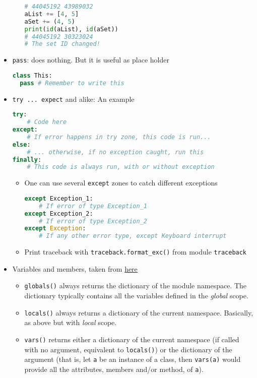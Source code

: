 \documentclass[a4paper,12pt,%
              final%
              ]{article}
\begin{document}
\begin{itemize}
\begin{itemize}
\begin{lstlisting}[language=python]
# 44045192 43989032
aList += [4, 5]
aSet += (4, 5)
print(id(aList), id(aSet))
# 44045192 30323024
# The set ID changed!
\end{lstlisting}
    \end{itemize}
  \item \verb|pass|: does nothing. But it is useful as place holder
\begin{lstlisting}[language=python]
class This:
  pass # Remember to write this
\end{lstlisting}
  \item \verb|try ... expect| and alike: An example
\begin{lstlisting}[language=python]
try:
    # Code here
except:
    # If error happens in try zone, this code is run...
else:
    # ... otherwise, if no exception caught, run this
finally:
    # This code is always run, with or without exception
\end{lstlisting}
    \begin{itemize}
      \item One can use several \texttt{except} zones to catch different exceptions
\begin{lstlisting}[language=python]
except Exception_1:
    # If error of type Exception_1
except Exception_2:
    # If error of type Exception_2
except Exception:
    # If any other error type, except Keyboard interrupt
\end{lstlisting}
      \item Print traceback with \verb|traceback.format_exc()| from module \texttt{traceback}
    \end{itemize}
  \item Variables and members, taken from \href{https://stackoverflow.com/questions/7969949/whats-the-difference-between-globals-locals-and-vars}{here}
    \begin{itemize}
      \item \verb|globals()| always returns the dictionary of the module namespace. The dictionary typically contains all the variables defined in the \emph{global} scope.
      \item \verb|locals()| always returns a dictionary of the current namespace. Basically, as above but with \emph{local} scope.
      \item \verb|vars()| returns either a dictionary of the current namespace (if called with no argument, equivalent to \verb|locals()|) or the dictionary of the argument (that is, let \verb|a| be an instance of a class, then \verb|vars(a)| would provide all the attributes, members and/or method, of \verb|a|).

\end{itemize}
\end{itemize}
\end{document}
